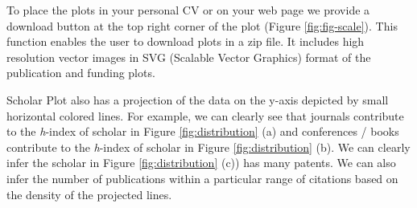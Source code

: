%
% 

To place the plots in your personal CV or on your web page we provide a download button at the top right corner of the plot (Figure \ref{fig:fig-scale}). This function enables the user to download plots in a zip file. It includes high resolution vector images in SVG (Scalable Vector Graphics) format of the publication and funding plots.

Scholar Plot also has a projection of the data on the y-axis depicted by small horizontal colored lines. For example, we can clearly see that journals contribute to the {\it h}-index of scholar in Figure \ref{fig:distribution} (a) and conferences / books contribute to the {\it h}-index of scholar in Figure \ref{fig:distribution} (b). We can clearly infer the scholar in Figure \ref{fig:distribution} (c)) has many patents. We can also infer the number of publications within a particular range of citations based on the density of the projected lines.

